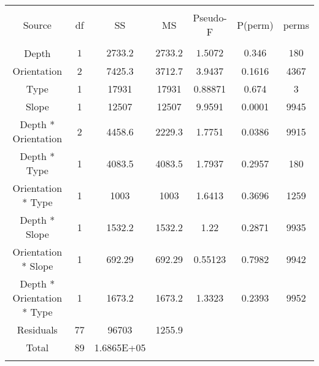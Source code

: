 \documentclass{article}
\begin{document}
\begin{table}[!htbp] \centering 
  \caption*{} 
  \label{} 
\begin{tabular}{@{\extracolsep{5pt}} ccccccc} 
\\[-1.8ex]\hline 
\hline \\[-1.8ex] 
Source & df & SS & MS & Pseudo-F  & P(perm) & perms\\ 
\hline \\[-1.8ex] 
Depth & $1$ & $2733.2$ & $2733.2$ & $1.5072$ & $0.346$ & $180$ \\ 
Orientation & 2 & 7425.3  & 3712.7 & 3.9437	 & 0.1616	 & 4367 \\ 
Type & 1 & 17931	& 17931	& 0.88871 &  0.674	&    3  \\ 
Slope & 1 & 12507 & 12507 & 9.9591 & 0.0001 & 9945 \\ 
Depth * Orientation & 2 & 4458.6 & 2229.3 & 1.7751 & 0.0386 & 9915 \\ 
Depth * Type	& 1	&    4083.5&	4083.5&	  1.7937&	 0.2957&	   180 \\
Orientation * Type & 1	&      1003	&  1003	&  1.6413&	 0.3696&	  1259 \\
Depth * Slope & 1	&    1532.2	&1532.2	&    1.22&	 0.2871	&  9935\\
Orientation * Slope &1 & 692.29	&692.29&	 0.55123&	 0.7982&	  9942\\
Depth * Orientation * Type &	 1&	    1673.2	&1673.2	&  1.3323&	 0.2393	 & 9952\\
Residuals &	77	&     96703&	1255.9\\
Total &	89	&1.6865E+05\\	
\hline \\[-1.8ex] 
\end{tabular} 
\end{table} 
\end{document}
